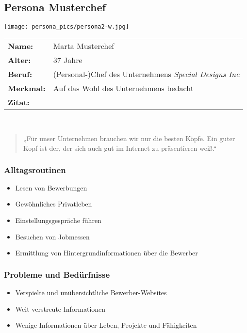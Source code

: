 \clearpage
\subsection{Persona Musterchef}
\begin{minipage}[t][][b]{.25\textwidth}
\texttt{[image: persona\_pics/persona2-w.jpg]}\end{minipage}\hfill
%
\begin{minipage}[t][][b]{.72\textwidth}
\noindent%
\begin{tabular}{L{.25} L{.7}}
\textbf{Name:} & Marta Musterchef\\
\textbf{Alter:} & 37 Jahre\\
\textbf{Beruf:} & (Personal-)Chef des Unternehmens \emph{Special Designs Inc}\\
\textbf{Merkmal:} & Auf das Wohl des Unternehmens bedacht\\
\textbf{Zitat:} & \\
\end{tabular}\\
\begin{quote}
„Für unser Unternehmen brauchen wir nur die besten Köpfe. Ein guter Kopf ist der, der sich auch gut im Internet zu präsentieren weiß.“
\end{quote}
\end{minipage}\vspace*{1em}

\begin{minipage}[t][][b]{.48\textwidth}
\subsubsection*{Alltagsroutinen}%
\begin{itemize}[leftmargin=*]
\item Lesen von Bewerbungen
\item Gewöhnliches Privatleben
\item Einstellungsgespräche führen
\item Besuchen von Jobmessen
\item Ermittlung von Hintergrundinformationen über die Bewerber
\end{itemize}
\end{minipage}\hfill
%
\begin{minipage}[t]{.48\textwidth}
\subsubsection*{Probleme und Bedürfnisse}%
\begin{itemize}[leftmargin=*]
\item Verspielte und unübersichtliche Bewerber-Websites
\item Weit verstreute Informationen
\item Wenige Informationen über Leben, Projekte und Fähigkeiten
\end{itemize}
\end{minipage}\bigskip

